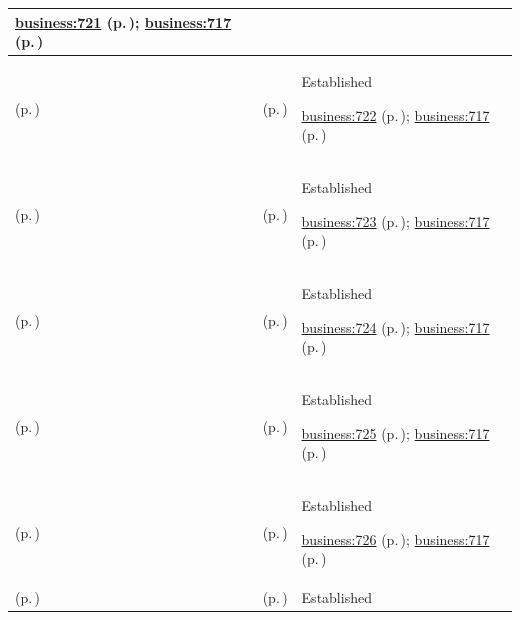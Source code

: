 \begin{longtable}{|>{\raggedright\arraybackslash}p{0.27\TableWidth}|>{\raggedright\arraybackslash}p{0.27\TableWidth}|>{\raggedright\arraybackslash}p{0.46\TableWidth}|}
 \hyperref[rad:business:719]{business:721} (p.\,\pageref{rad:business:719}); \hyperref[rad:business:717]{business:717} (p.\,\pageref{rad:business:717})\\\hline
\nameref{cap:bc-clinical-semantics-governance} (p.\,\pageref{cap:bc-clinical-semantics-governance}) & \nameref{cap:bc-terminology-utilisation-oversight} (p.\,\pageref{cap:bc-terminology-utilisation-oversight}) & Established

 \hyperref[rad:business:719]{business:722} (p.\,\pageref{rad:business:719}); \hyperref[rad:business:717]{business:717} (p.\,\pageref{rad:business:717})\\\hline
\nameref{cap:bc-clinical-semantics-governance} (p.\,\pageref{cap:bc-clinical-semantics-governance}) & \nameref{cap:bc-terminology-localisation} (p.\,\pageref{cap:bc-terminology-localisation}) & Established

 \hyperref[rad:business:719]{business:723} (p.\,\pageref{rad:business:719}); \hyperref[rad:business:717]{business:717} (p.\,\pageref{rad:business:717})\\\hline
\nameref{cap:bc-clinical-semantics-governance} (p.\,\pageref{cap:bc-clinical-semantics-governance}) & \nameref{cap:bc-classification-governance} (p.\,\pageref{cap:bc-classification-governance}) & Established

 \hyperref[rad:business:719]{business:724} (p.\,\pageref{rad:business:719}); \hyperref[rad:business:717]{business:717} (p.\,\pageref{rad:business:717})\\\hline
\nameref{cap:bc-clinical-semantics-governance} (p.\,\pageref{cap:bc-clinical-semantics-governance}) & \nameref{cap:bc-classification-utilisation-oversight} (p.\,\pageref{cap:bc-classification-utilisation-oversight}) & Established

 \hyperref[rad:business:719]{business:725} (p.\,\pageref{rad:business:719}); \hyperref[rad:business:717]{business:717} (p.\,\pageref{rad:business:717})\\\hline
\nameref{cap:bc-clinical-semantics-governance} (p.\,\pageref{cap:bc-clinical-semantics-governance}) & \nameref{cap:bc-semantic-mapping-governance} (p.\,\pageref{cap:bc-semantic-mapping-governance}) & Established

 \hyperref[rad:business:719]{business:726} (p.\,\pageref{rad:business:719}); \hyperref[rad:business:717]{business:717} (p.\,\pageref{rad:business:717})\\\hline
\nameref{cap:bc-connected-health-services} (p.\,\pageref{cap:bc-connected-health-services}) & \nameref{cap:bc-health-information-exchange} (p.\,\pageref{cap:bc-health-information-exchange}) & Established


\end{longtable}
